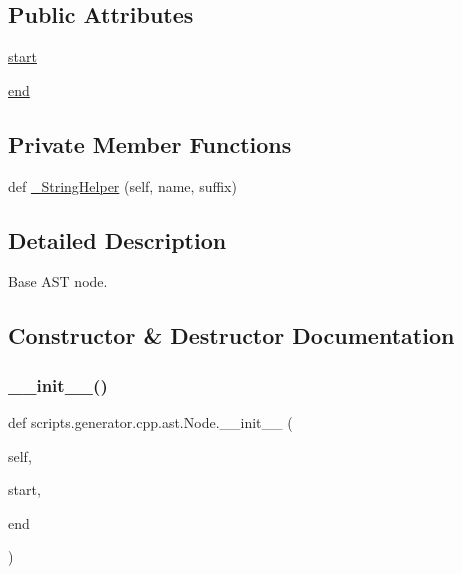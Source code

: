 \subsection*{Public Attributes}
\begin{DoxyCompactItemize}
\item 
\mbox{\hyperlink{classscripts_1_1generator_1_1cpp_1_1ast_1_1_node_a27ce0a583baee598b75ac6dd21f8575b}{start}}
\item 
\mbox{\hyperlink{classscripts_1_1generator_1_1cpp_1_1ast_1_1_node_a8e3394f9dd405352610ff9be4f284e2c}{end}}
\end{DoxyCompactItemize}
\subsection*{Private Member Functions}
\begin{DoxyCompactItemize}
\item 
def \mbox{\hyperlink{classscripts_1_1generator_1_1cpp_1_1ast_1_1_node_a2d82f4d3e24f5ddef577514ca3e74a89}{\+\_\+\+String\+Helper}} (self, name, suffix)
\end{DoxyCompactItemize}


\subsection{Detailed Description}
\begin{DoxyVerb}Base AST node.\end{DoxyVerb}
 

\subsection{Constructor \& Destructor Documentation}
\mbox{\label{classscripts_1_1generator_1_1cpp_1_1ast_1_1_node_a2fb8663ae0868eea076a5eca6eaa7ca3}} 
\subsubsection{\texorpdfstring{\_\_init\_\_()}{\_\_init\_\_()}}
{\footnotesize\ttfamily def scripts.\+generator.\+cpp.\+ast.\+Node.\+\_\+\+\_\+init\+\_\+\+\_\+ (\begin{DoxyParamCaption}\item[{}]{self,  }\item[{}]{start,  }\item[{}]{end }\end{DoxyParamCaption})}



